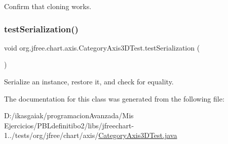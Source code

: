 Confirm that cloning works. \mbox{\label{classorg_1_1jfree_1_1chart_1_1axis_1_1_category_axis3_d_test_a7bf6a3b20bb752f0628d4694c54c3b9e}} 
\subsubsection{\texorpdfstring{test\+Serialization()}{testSerialization()}}
{\footnotesize\ttfamily void org.\+jfree.\+chart.\+axis.\+Category\+Axis3\+D\+Test.\+test\+Serialization (\begin{DoxyParamCaption}{ }\end{DoxyParamCaption})}

Serialize an instance, restore it, and check for equality. 

The documentation for this class was generated from the following file\+:\begin{DoxyCompactItemize}
\item 
D\+:/ikasgaiak/programacion\+Avanzada/\+Mis Ejercicios/\+P\+B\+Ldefinitibo2/libs/jfreechart-\/1../tests/org/jfree/chart/axis/\mbox{\hyperlink{_category_axis3_d_test_8java}{Category\+Axis3\+D\+Test.\+java}}\end{DoxyCompactItemize}
